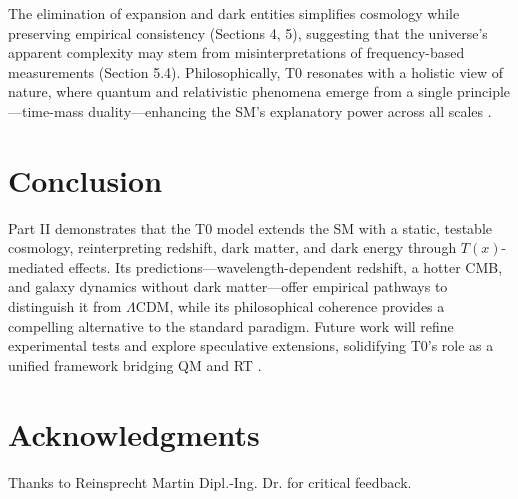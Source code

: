 \documentclass[12pt,a4paper]{article}
\newenvironment{acknowledgments}
{\section*{Acknowledgments}}
{\vspace{1em}}
\newcommand{\Tfield}{T(x)}
\begin{document}
	The elimination of expansion and dark entities simplifies cosmology while preserving empirical consistency (Sections 4, 5), suggesting that the universe’s apparent complexity may stem from misinterpretations of frequency-based measurements (Section 5.4). Philosophically, T0 resonates with a holistic view of nature, where quantum and relativistic phenomena emerge from a single principle—time-mass duality—enhancing the SM’s explanatory power across all scales \cite{pascher_perspective_2025}.
	
	\section{Conclusion}
	\label{sec:conclusion}
	
	Part II demonstrates that the T0 model extends the SM with a static, testable cosmology, reinterpreting redshift, dark matter, and dark energy through \(\Tfield\)-mediated effects. Its predictions—wavelength-dependent redshift, a hotter CMB, and galaxy dynamics without dark matter—offer empirical pathways to distinguish it from \(\Lambda\)CDM, while its philosophical coherence provides a compelling alternative to the standard paradigm. Future work will refine experimental tests and explore speculative extensions, solidifying T0’s role as a unified framework bridging QM and RT \cite{pascher_perspective_2025}.
	
	\begin{acknowledgments}
		Thanks to Reinsprecht Martin Dipl.-Ing. Dr. for critical feedback.
	\end{acknowledgments}
	
\end{document}
